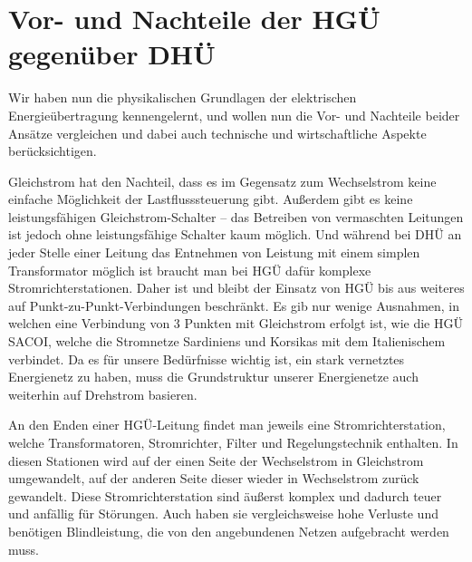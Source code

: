 \section{Vor- und Nachteile der HGÜ gegenüber DHÜ}
Wir haben nun die physikalischen Grundlagen der elektrischen Energieübertragung kennengelernt, und wollen nun die Vor- und Nachteile beider Ansätze vergleichen und dabei auch technische und wirtschaftliche Aspekte berücksichtigen.

Gleichstrom hat den Nachteil, dass es im Gegensatz zum Wechselstrom keine einfache Möglichkeit der Lastflusssteuerung gibt.
Außerdem gibt es keine leistungsfähigen Gleichstrom-Schalter – das Betreiben von vermaschten Leitungen ist jedoch ohne leistungsfähige Schalter kaum möglich.\cite{Schymroch} 
Und während bei DHÜ an jeder Stelle einer Leitung das Entnehmen von Leistung mit einem simplen Transformator möglich ist braucht man bei HGÜ dafür komplexe Stromrichterstationen.\cite{Schymroch}
Daher ist und bleibt der Einsatz von HGÜ bis aus weiteres auf Punkt-zu-Punkt-Verbindungen beschränkt. Es gib nur wenige Ausnahmen, in welchen eine Verbindung von 3 Punkten mit Gleichstrom erfolgt ist, wie die HGÜ SACOI, welche die Stromnetze Sardiniens und Korsikas mit dem Italienischem verbindet.
Da es für unsere Bedürfnisse wichtig ist, ein stark vernetztes Energienetz zu haben, muss die Grundstruktur %
unserer Energienetze auch weiterhin auf Drehstrom basieren.

An den Enden einer HGÜ-Leitung findet man jeweils eine Stromrichterstation, welche Transformatoren, Stromrichter, Filter und Regelungstechnik enthalten.\cite{Schymroch} In diesen Stationen wird auf der einen Seite der Wechselstrom in Gleichstrom umgewandelt, auf der anderen Seite dieser wieder in Wechselstrom zurück gewandelt.
Diese Stromrichterstation sind äußerst komplex und dadurch teuer und anfällig für Störungen. Auch haben sie vergleichsweise hohe Verluste und benötigen Blindleistung, die von den angebundenen Netzen aufgebracht werden muss.

